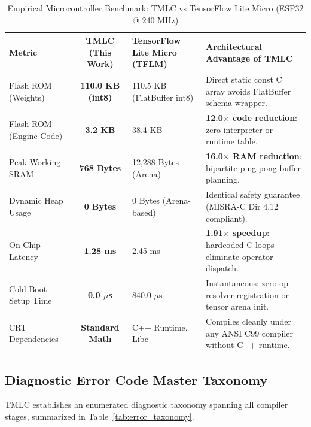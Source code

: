 \documentclass[11pt,a4paper]{article}
\begin{document}
\begin{table}[htbp]
\centering
\small
\caption{Empirical Microcontroller Benchmark: TMLC vs TensorFlow Lite Micro (ESP32 @ 240 MHz)}
\label{tab:tflm_vs_tmlc_esp32}
\begin{tabular}{lcp{3.8cm}p{3.8cm}}
\toprule
\textbf{Metric} & \textbf{TMLC (This Work)} & \textbf{TensorFlow Lite Micro (TFLM)} & \textbf{Architectural Advantage of TMLC} \\
\midrule
Flash ROM (Weights)     & \textbf{110.0 KB (int8)} & 110.5 KB (FlatBuffer int8) & Direct static const C array avoids FlatBuffer schema wrapper. \\
Flash ROM (Engine Code) & \textbf{3.2 KB}          & 38.4 KB                     & \textbf{12.0$\times$ code reduction}: zero interpreter or runtime table. \\
Peak Working SRAM       & \textbf{768 Bytes}       & 12,288 Bytes (Arena)        & \textbf{16.0$\times$ RAM reduction}: bipartite ping-pong buffer planning. \\
Dynamic Heap Usage      & \textbf{0 Bytes}         & 0 Bytes (Arena-based)       & Identical safety guarantee (MISRA-C Dir 4.12 compliant). \\
On-Chip Latency         & \textbf{1.28 ms}         & 2.45 ms                     & \textbf{1.91$\times$ speedup}: hardcoded C loops eliminate operator dispatch. \\
Cold Boot Setup Time    & \textbf{0.0 $\mu$s}      & 840.0 $\mu$s                & Instantaneous: zero op resolver registration or tensor arena init. \\
CRT Dependencies        & \textbf{Standard Math}   & C++ Runtime, Libc           & Compiles cleanly under any ANSI C99 compiler without C++ runtime. \\
\bottomrule
\end{tabular}
\end{table}

\subsection{Diagnostic Error Code Master Taxonomy}
TMLC establishes an enumerated diagnostic taxonomy spanning all compiler stages, summarized in Table~\ref{tab:error_taxonomy}.
\end{document}
